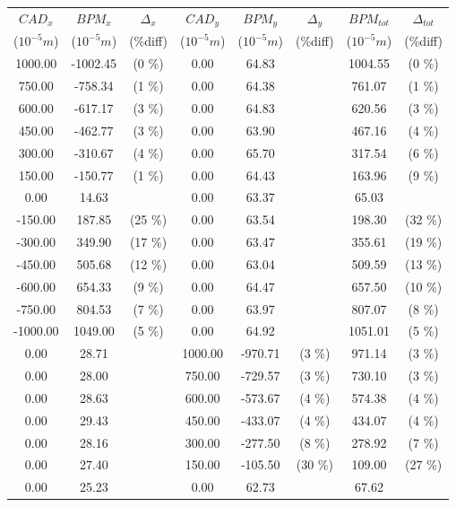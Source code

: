 \begin{table}
\centering
\begin{tabular}{c c c c c c c c}
\toprule
\textbf{$CAD_{x}$} & \textbf{$BPM_{x}$ } & \textbf{$\Delta_{x}$} &\textbf{$CAD_{y}$} & \textbf{$BPM_{y}$} & \textbf{$\Delta_{y}$} & \textbf{$BPM_{tot}$} & \textbf{$\Delta_{tot}$} \\
($10^{-5} m$) & ($10^{-5} m$) & (\%diff) & ($10^{-5} m$) & ($10^{-5} m$) & (\%diff) & ($10^{-5} m$) & (\%diff) \\
\midrule
1000.00 & -1002.45 &  (0 \%) & 0.00 & 64.83 &  & 1004.55 &  (0 \%)\\
750.00 & -758.34 &  (1 \%) & 0.00 & 64.38 &  & 761.07 &  (1 \%)\\
600.00 & -617.17 &  (3 \%) & 0.00 & 64.83 &  & 620.56 &  (3 \%)\\
450.00 & -462.77 &  (3 \%) & 0.00 & 63.90 &  & 467.16 &  (4 \%)\\
300.00 & -310.67 &  (4 \%) & 0.00 & 65.70 &  & 317.54 &  (6 \%)\\
150.00 & -150.77 &  (1 \%) & 0.00 & 64.43 &  & 163.96 &  (9 \%)\\
0.00 & 14.63 &  & 0.00 & 63.37 &  & 65.03 & \\
-150.00 & 187.85 &  (25 \%) & 0.00 & 63.54 &  & 198.30 &  (32 \%)\\
-300.00 & 349.90 &  (17 \%) & 0.00 & 63.47 &  & 355.61 &  (19 \%)\\
-450.00 & 505.68 &  (12 \%) & 0.00 & 63.04 &  & 509.59 &  (13 \%)\\
-600.00 & 654.33 &  (9 \%) & 0.00 & 64.47 &  & 657.50 &  (10 \%)\\
-750.00 & 804.53 &  (7 \%) & 0.00 & 63.97 &  & 807.07 &  (8 \%)\\
-1000.00 & 1049.00 &  (5 \%) & 0.00 & 64.92 &  & 1051.01 &  (5 \%)\\
0.00 & 28.71 &  & 1000.00 & -970.71 &  (3 \%) & 971.14 &  (3 \%)\\
0.00 & 28.00 &  & 750.00 & -729.57 &  (3 \%) & 730.10 &  (3 \%)\\
0.00 & 28.63 &  & 600.00 & -573.67 &  (4 \%) & 574.38 &  (4 \%)\\
0.00 & 29.43 &  & 450.00 & -433.07 &  (4 \%) & 434.07 &  (4 \%)\\
0.00 & 28.16 &  & 300.00 & -277.50 &  (8 \%) & 278.92 &  (7 \%)\\
0.00 & 27.40 &  & 150.00 & -105.50 &  (30 \%) & 109.00 &  (27 \%)\\
0.00 & 25.23 &  & 0.00 & 62.73 &  & 67.62 & \\

\end{tabular}
\end{table}
